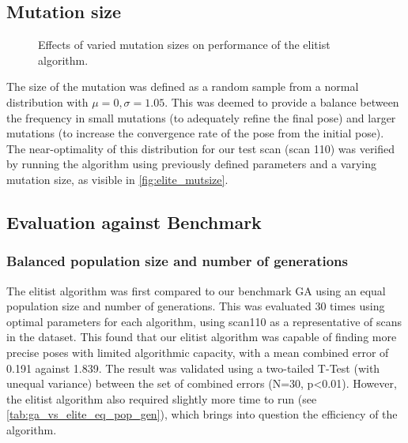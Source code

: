 \documentclass[authoryearcitations]{UoYCSproject}
\begin{document}
\subsection{Mutation size}

\datatableelitemutsize

\begin{figure}
	\centering
	\caption[Optimising mutation step size for the elitist selection algorithm.]{Effects of varied mutation sizes on performance of the elitist algorithm.}
	\label{fig:elite_mutsize}
\end{figure}

The size of the mutation was defined as a random sample from a normal distribution with $\mu=0, \sigma=1.05$. This was deemed to provide a balance between the frequency in small mutations (to adequately refine the final pose) and larger mutations (to increase the convergence rate of the pose from the initial pose). The near-optimality of this distribution for our test scan (scan 110) was verified by running the algorithm using previously defined parameters and a varying mutation size, as visible in \autoref{fig:elite_mutsize}.

\subsection{Evaluation against Benchmark}
\subsubsection{Balanced population size and number of generations}
\label{subsec:ga_vs_elite_eq_pop_gen}
The elitist algorithm was first compared to our benchmark GA using an equal population size and number of generations. This was evaluated 30 times using optimal parameters for each algorithm, using scan110 as a representative of scans in the dataset. This found that our elitist algorithm was capable of finding more precise poses with limited algorithmic capacity, with a mean combined error of 0.191 against 1.839. The result was validated using a two-tailed T-Test (with unequal variance) between the set of combined errors (N=30, p<0.01). However, the elitist algorithm also required slightly more time to run (see \autoref{tab:ga_vs_elite_eq_pop_gen}), which brings into question the efficiency of the algorithm.
\end{document}
